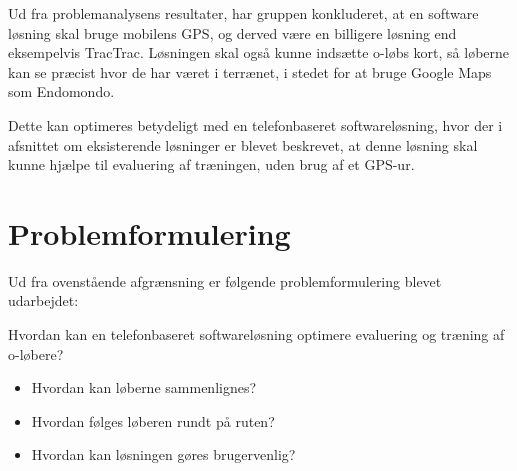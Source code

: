 Ud fra problemanalysens resultater, har gruppen konkluderet, at en software løsning skal bruge mobilens GPS, og derved være en billigere løsning end eksempelvis TracTrac. Løsningen skal også kunne indsætte o-løbs kort, så løberne kan se præcist hvor de har været i terrænet, i stedet for at bruge Google Maps som Endomondo. 

Dette kan optimeres betydeligt med en telefonbaseret softwareløsning, hvor der i afsnittet om eksisterende løsninger er blevet beskrevet, at denne løsning skal kunne hjælpe til evaluering af træningen, uden brug af et GPS-ur.

\section{Problemformulering}
Ud fra ovenstående afgrænsning er følgende problemformulering blevet udarbejdet:

Hvordan kan en telefonbaseret softwareløsning optimere evaluering og træning af o-løbere?
\begin{itemize}
	\item Hvordan kan løberne sammenlignes?
	\item Hvordan følges løberen rundt på ruten?
	\item Hvordan kan løsningen gøres brugervenlig?
\end{itemize}

